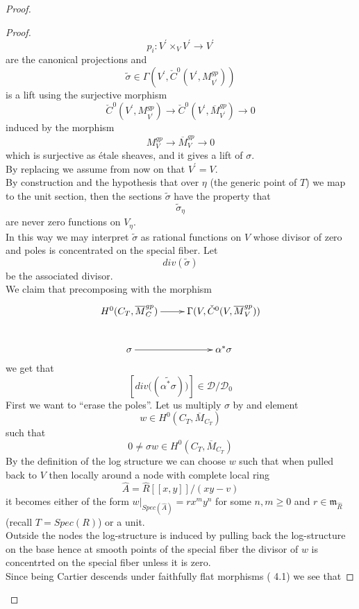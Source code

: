 \documentclass{amsart}
\theoremstyle{definition}
\numberwithin{equation}{section}
\begin{document}
\begin{proof}
\begin{proof}
$$
p_i:V^{\prime}\times_V V^{\prime}{\rightarrow} V^{\prime}
$$
\noindent are the canonical projections and
$$
\tilde{\sigma}\in \Gamma(V^{\prime},\check{C}^0(V^{\prime},M_{V^{\prime}}^{gp}))
$$
\noindent is a lift using the surjective morphism
$$
\check{C}^0(V^{\prime},M_{V^{\prime}}^{gp}) {\rightarrow}  \check{C}^0(V^{\prime},\overline{M}_{V^{\prime}}^{gp}){\rightarrow} 0
$$
\noindent induced by the morphism 
\begin{equation}\label{surj:zar}
M_{V}^{gp}{\rightarrow} \overline{M}_{V}^{gp}{\rightarrow} 0
\end{equation}
\noindent which is surjective as \'etale sheaves, and it gives a lift of $\sigma$.\\
By replacing we assume from now on that $V^{\prime}=V$.\\
By construction and the hypothesis that over $\eta$ (the generic point of $T$) we map to the unit section, then the sections $\tilde{\sigma}$ have the property that 
$$
\tilde{\sigma}_{\eta}
$$
\noindent are never zero functions on $V_{\eta}$.\\ 
In this way we may interpret $\tilde{\sigma}$ as rational functions on $V$ whose divisor of zero and poles is concentrated on the special fiber. 
Let 
$$
div( \tilde{\sigma})
$$
\noindent be the associated divisor. \\ 
We claim that precomposing with the morphism
$$
\xymatrix{
    {H^0(C_T,\overline{M}_C^{gp})}\ar[r] & {\Gamma(V,\check{C}^0(V,\overline{M}_V^{gp}))}\\
    {\sigma} \ar[r] & {\alpha^{*}\sigma}
}
$$
\noindent we get that
$$
    [div\big( (\widetilde{\alpha^{*}\sigma})\big)]\in\mathcal{D}/\mathcal{D}_0
$$
\noindent First we want to ``erase the poles''. Let us multiply $\sigma$ by and element 
$$
w\in H^0(C_T,\overline{M}_{C_T})
$$
\noindent such that
$$
0\neq\sigma w\in H^0(C_T,\overline{M}_{C_T})
$$
\noindent By the definition of the log structure we can choose $w$ such that when pulled back to $V$ then locally around a node with complete local ring
$$
\hat{A}=\hat{R}[[x,y ]]/(xy-v) 
$$
\noindent it becomes either of the form $w|_{Spec(\hat{A})}=rx^my^n$ for some $n,m\geq 0$ and $r\in \mathfrak{m}_{\widehat{R}}$ (recall $T=Spec(R)$) or a unit.\\
Outside the nodes the log-structure is induced by pulling back the log-structure on the base hence at smooth points of the special fiber the divisor of $w$ is concentrted on the special fiber unless it is zero.\\
Since being Cartier descends under faithfully flat morphisms (\cite{hol} 4.1) we see that 

\end{proof}
\end{proof}
\end{document}
